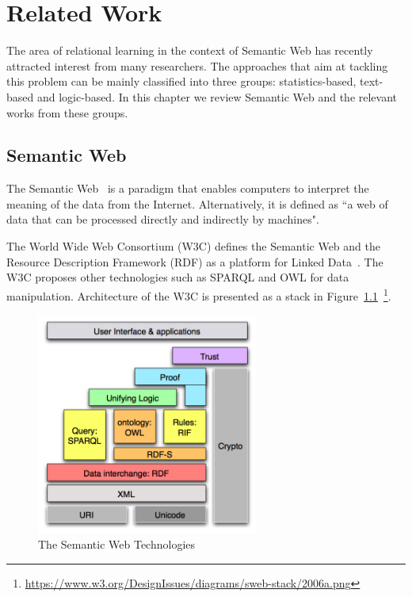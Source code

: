 \chapter{Related Work}
\label{chap:relwork}

The area of relational learning in the context of Semantic Web has recently attracted interest from many researchers. The approaches that aim at tackling this problem can be mainly classified into three groups: statistics-based, text-based and logic-based. In this chapter we review Semantic Web and the relevant works from these groups.

\section{Semantic Web}

The Semantic Web~\cite{ref26} is a paradigm that enables computers to interpret the meaning of the data from the Internet. Alternatively, it is defined as ``a web of data that can be processed directly and indirectly by machines".

The World Wide Web Consortium (W3C) defines the Semantic Web and the Resource Description Framework (RDF) as a platform for Linked Data~\cite{ref26}. The W3C proposes other technologies such as SPARQL and OWL for data manipulation. Architecture of the W3C is presented as a stack in Figure~\ref{fig1}~\footnote{\url{https://www.w3.org/DesignIssues/diagrams/sweb-stack/2006a.png}}.

\begin{figure}
\centering
\includegraphics[width=0.65\textwidth]{figures/semantic_web.png}
\caption{The Semantic Web Technologies}
\label{fig1}
\end{figure}

